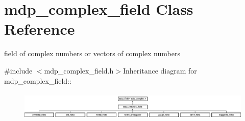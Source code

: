 \hypertarget{classmdp__complex__field}{
\section{mdp\_\-complex\_\-field Class Reference}
\label{classmdp__complex__field}
}


field of complex numbers or vectors of complex numbers  


{\ttfamily \#include $<$mdp\_\-complex\_\-field.h$>$}Inheritance diagram for mdp\_\-complex\_\-field::\begin{figure}[H]
\begin{center}
\leavevmode
\includegraphics[height=1.37931cm]{classmdp__complex__field}
\end{center}
\end{figure}
